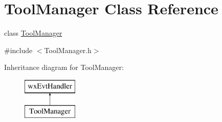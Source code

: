 \hypertarget{class_tool_manager}{}\section{Tool\+Manager Class Reference}
\label{class_tool_manager}


class \hyperlink{class_tool_manager}{Tool\+Manager}  




{\ttfamily \#include $<$Tool\+Manager.\+h$>$}

Inheritance diagram for Tool\+Manager\+:\begin{figure}[H]
\begin{center}
\leavevmode
\includegraphics[height=2.000000cm]{class_tool_manager}
\end{center}
\end{figure}
